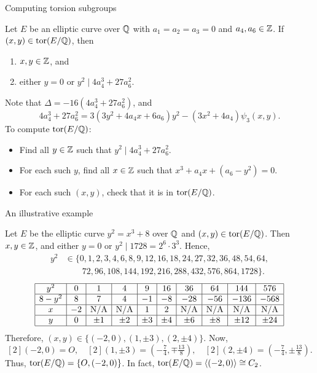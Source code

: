 \begin{frame}{Computing torsion subgroups}

\begin{theorem}
Let $ E $ be an elliptic curve over $ \mathbb{Q} $ with $ a_1 = a_2 = a_3 = 0 $ and $ a_4, a_6 \in \mathbb{Z} $. If $ (x, y) \in \operatorname{tor}(E / \mathbb{Q}) $, then
\begin{enumerate}
\item $ x, y \in \mathbb{Z} $, and
\item either $ y = 0 $ or $ y^2 \mid 4a_4^3 + 27a_6^2 $.
\end{enumerate}
\end{theorem}

Note that $ \Delta = -16(4a_4^3 + 27a_6^2) $, and
$$ 4a_4^3 + 27a_6^2 = 3(3y^2 + 4a_4x + 6a_6)y^2 - (3x^2 + 4a_4)\psi_3(x, y). $$
To compute $ \operatorname{tor}(E / \mathbb{Q}) $:
\begin{itemize}
\item Find all $ y \in \mathbb{Z} $ such that $ y^2 \mid 4a_4^3 + 27a_6^2 $.
\item For each such $ y $, find all $ x \in \mathbb{Z} $ such that $ x^3 + a_4x + (a_6 - y^2) = 0 $.
\item For each such $ (x, y) $, check that it is in $ \operatorname{tor}(E / \mathbb{Q}) $.
\end{itemize}

\end{frame}

\begin{frame}{An illustrative example}

Let $ E $ be the elliptic curve $ y^2 = x^3 + 8 $ over $ \mathbb{Q} $ and $ (x, y) \in \operatorname{tor}(E / \mathbb{Q}) $. Then $ x, y \in \mathbb{Z} $, and either $ y = 0 $ or $ y^2 \mid 1728 = 2^6 \cdot 3^3 $. Hence,
\begin{align*}
y^2
& \in \{0, 1, 2, 3, 4, 6, 8, 9, 12, 16, 18, 24, 27, 32, 36, 48, 54, 64, \\
& \qquad 72, 96, 108, 144, 192, 216, 288, 432, 576, 864, 1728\}.
\end{align*}
$$
\begin{array}{|c|c|c|c|c|c|c|c|c|c|}
\hline
y^2 & 0 & 1 & 4 & 9 & 16 & 36 & 64 & 144 & 576 \\
\hline
8 - y^2 & 8 & 7 & 4 & -1 & -8 & -28 & -56 & -136 & -568 \\
\hline
x & -2 & \text{N/A} & \text{N/A} & 1 & 2 & \text{N/A} & \text{N/A} & \text{N/A} & \text{N/A} \\
\hline
y & 0 & \pm1 & \pm2 & \pm3 & \pm4 & \pm6 & \pm8 & \pm12 & \pm24 \\
\hline
\end{array}
$$
Therefore, $ (x, y) \in \{(-2, 0), (1, \pm3), (2, \pm4)\} $. Now,
$$ [2](-2, 0) = O, \quad [2](1, \pm3) = (-\tfrac{7}{4}, \mp\tfrac{13}{8}), \quad [2](2, \pm4) = (-\tfrac{7}{4}, \pm\tfrac{13}{8}). $$
Thus, $ \operatorname{tor}(E / \mathbb{Q}) = \{O, (-2, 0)\} $. In fact, $ \operatorname{tor}(E / \mathbb{Q}) = \langle(-2, 0)\rangle \cong C_2 $.

\end{frame}

